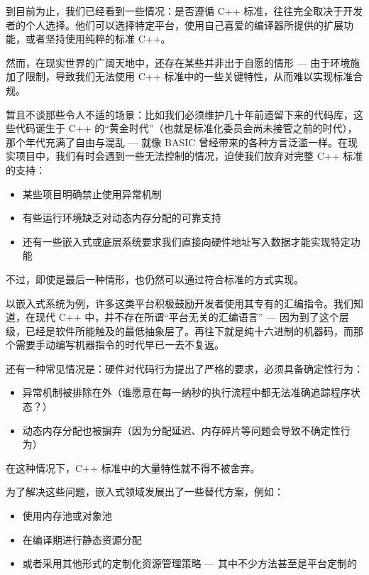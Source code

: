 到目前为止，我们已经看到一些情况：是否遵循 C++ 标准，往往完全取决于开发者的个人选择。他们可以选择特定平台，使用自己喜爱的编译器所提供的扩展功能，或者坚持使用纯粹的标准 C++。

然而，在现实世界的广阔天地中，还存在某些并非出于自愿的情形 --- 由于环境施加了限制，导致我们无法使用 C++ 标准中的一些关键特性，从而难以实现标准合规。

暂且不谈那些令人不适的场景：比如我们必须维护几十年前遗留下来的代码库，这些代码诞生于 C++ 的“黄金时代”（也就是标准化委员会尚未接管之前的时代），那个年代充满了自由与混乱 --- 就像 BASIC 曾经带来的各种方言泛滥一样。在现实项目中，我们有时会遇到一些无法控制的情况，迫使我们放弃对完整 C++ 标准的支持：

\begin{itemize}
\item 
某些项目明确禁止使用异常机制

\item 
有些运行环境缺乏对动态内存分配的可靠支持

\item 
还有一些嵌入式或底层系统要求我们直接向硬件地址写入数据才能实现特定功能
\end{itemize}

不过，即使是最后一种情形，也仍然可以通过符合标准的方式实现。

以嵌入式系统为例，许多这类平台积极鼓励开发者使用其专有的汇编指令。我们知道，在现代 C++ 中，并不存在所谓“平台无关的汇编语言” --- 因为到了这个层级，已经是软件所能触及的最低抽象层了。再往下就是纯十六进制的机器码，而那个需要手动编写机器指令的时代早已一去不复返。

还有一种常见情况是：硬件对代码行为提出了严格的要求，必须具备确定性行为：

\begin{itemize}
\item 
异常机制被排除在外（谁愿意在每一纳秒的执行流程中都无法准确追踪程序状态？）

\item 
动态内存分配也被摒弃（因为分配延迟、内存碎片等问题会导致不确定性行为）
\end{itemize}

在这种情况下，C++ 标准中的大量特性就不得不被舍弃。

为了解决这些问题，嵌入式领域发展出了一些替代方案，例如：

\begin{itemize}
\item 
使用内存池或对象池

\item 
在编译期进行静态资源分配

\item 
或者采用其他形式的定制化资源管理策略 --- 其中不少方法甚至是平台定制的
\end{itemize}

